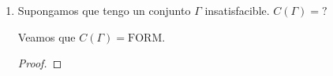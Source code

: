 \begin{enumerate}
\begin{enumerate}
\begin{proof}
\begin{itemize}
                    Quiero ver que $\alpha$ es tautología.

                    \medskip

                    Supongo que no 
                    $\implies \exists \; v \text{ valuación}/v(\alpha)=0$

                    Pero $v(\varnothing)=1 \implies \alpha \notin
                    C(\varnothing)$

                    ¡Absurdo!
                    Vino de suponer que $\alpha$ no era una tautología.

                \item[$\supseteq$)] $\alpha$ tautología.

                    Quiero ver que $\alpha \in C(\varnothing)$

                    \medskip

                    Sea $v \text{ valuación} / v(\varnothing)=1$
                    $\implies \underbrace{v(\alpha)=1}_{\alpha \text{ taut.}}$
            \end{itemize}
        \end{proof}

        \bigskip

        Otra forma:

        \begin{proof} \phantom{.}
        
            Como toda valuación satisface el $\varnothing$, si 
            \begin{gather*}
                \alpha \in C(\varnothing) \implies v(\alpha) = 1
                \notamath{$\forall v$ valuación} \\
            \end{gather*}
            \begin{gather*}
                \therefore ~ \alpha \in C(\varnothing) \iff \alpha 
                \text{ es tautología}
            \end{gather*}
        \end{proof}

    \item Supongamos que tengo un conjunto $\Gamma$ insatisfacible.
        $C(\Gamma) = ?$

        Veamos que $C(\Gamma) = \mathrm{FORM}$.

        \begin{proof} \phantom{.}
        

\end{proof}
\end{enumerate}
\end{enumerate}
